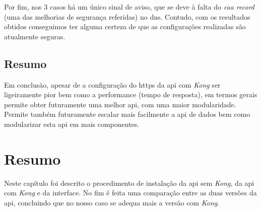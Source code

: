 Por fim, nos 3 casos há um único sinal de aviso, que se deve à falta do \textit{\acrshort{caa} record} (uma das melhorias de segurança referidas) no \acrshort{dns}. Contudo, com os resultados obtidos conseguimos ter alguma certeza de que as configurações realizadas são atualmente seguras.

\subsection{Resumo}

Em conclusão, apesar de a configuração do \acrshort{https} da \acrshort{api} com \textit{Kong} ser ligeiramente pior bem como a performance (tempo de resposta), em termos gerais permite obter futuramente uma melhor \acrshort{api}, com uma maior modularidade. Permite também futuramente escalar mais facilmente a \acrshort{api} de dados bem como modularizar esta \acrshort{api} em mais componentes.

\section{Resumo}

Neste capítulo foi descrito o procedimento de instalação da \acrshort{api} sem \textit{Kong}, da \acrshort{api} com \textit{Kong} e da interface. No fim é feita uma comparação entre as duas versões da \acrshort{api}, concluindo que no nosso caso se adequa mais a versão com \textit{Kong}.
